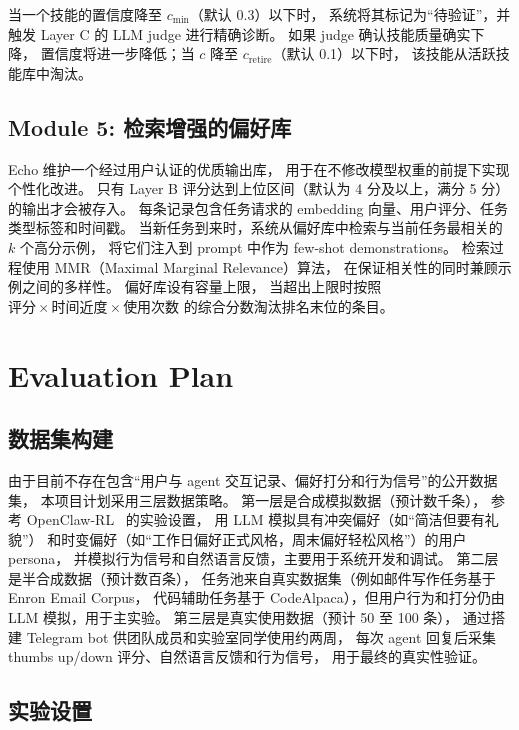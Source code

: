 \documentclass[12pt,a4paper]{article}
\begin{document}
	当一个技能的置信度降至 $c_{\min}$（默认 0.3）以下时，
	系统将其标记为``待验证''，并触发 Layer C 的 LLM judge 进行精确诊断。
	如果 judge 确认技能质量确实下降，
	置信度将进一步降低；当 $c$ 降至 $c_{\text{retire}}$（默认 0.1）以下时，
	该技能从活跃技能库中淘汰。
	
	\subsection{Module 5: 检索增强的偏好库}
	
	Echo 维护一个经过用户认证的优质输出库，
	用于在不修改模型权重的前提下实现个性化改进。
	只有 Layer B 评分达到上位区间（默认为 4 分及以上，满分 5 分）的输出才会被存入。
	每条记录包含任务请求的 embedding 向量、用户评分、任务类型标签和时间戳。
	当新任务到来时，系统从偏好库中检索与当前任务最相关的 $k$ 个高分示例，
	将它们注入到 prompt 中作为 few-shot demonstrations。
	检索过程使用 MMR（Maximal Marginal Relevance）算法，
	在保证相关性的同时兼顾示例之间的多样性。
	偏好库设有容量上限，
	当超出上限时按照 $\text{评分} \times \text{时间近度} \times \text{使用次数}$
	的综合分数淘汰排名末位的条目。
	
	
	\section{Evaluation Plan}
	
	\subsection{数据集构建}
	
	由于目前不存在包含``用户与 agent 交互记录、偏好打分和行为信号''的公开数据集，
	本项目计划采用三层数据策略。
	第一层是合成模拟数据（预计数千条），
	参考 OpenClaw-RL~\cite{openclaw_rl} 的实验设置，
	用 LLM 模拟具有冲突偏好（如``简洁但要有礼貌''）
	和时变偏好（如``工作日偏好正式风格，周末偏好轻松风格''）的用户 persona，
	并模拟行为信号和自然语言反馈，主要用于系统开发和调试。
	第二层是半合成数据（预计数百条），
	任务池来自真实数据集（例如邮件写作任务基于 Enron Email Corpus，
	代码辅助任务基于 CodeAlpaca），但用户行为和打分仍由 LLM 模拟，用于主实验。
	第三层是真实使用数据（预计 50 至 100 条），
	通过搭建 Telegram bot 供团队成员和实验室同学使用约两周，
	每次 agent 回复后采集 thumbs up/down 评分、自然语言反馈和行为信号，
	用于最终的真实性验证。
	
	\subsection{实验设置}
	
\end{document}
